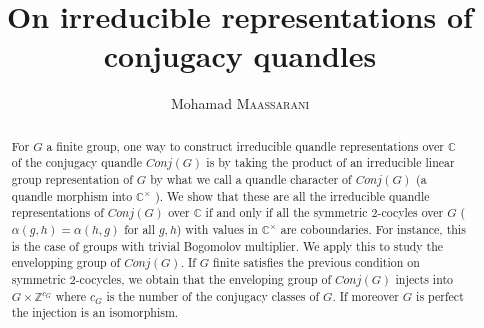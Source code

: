 \documentclass[12pt, reqno]{amsart}
\begin{document}
 
\title{On irreducible representations of conjugacy quandles}

 


 
\author{Mohamad \textsc{Maassarani} }
\maketitle
\begin{abstract}For $G$ a finite group, one way to construct irreducible quandle representations over $\mathbb{C}$ of the conjugacy quandle $Conj(G)$ is by taking the product of an irreducible linear group representation of $G$ by what we call a quandle character of $Conj(G)$ (a quandle morphism into $\mathbb{C}^\times$ ). We show that these are all the irreducible quandle representations of $Conj(G)$ over $\mathbb{C}$ if and only if all the symmetric $2$-cocyles over $G$  ($\alpha(g,h)=\alpha(h,g)$ for all $g,h$) with values in $\mathbb{C}^\times$ are coboundaries. For instance, this is the case of groups with trivial Bogomolov multiplier. We apply this to study the envelopping group of $Conj(G)$. If $G$ finite satisfies the previous condition on symmetric $2$-cocycles, we obtain that the enveloping group of $Conj(G)$ injects into $G\times \mathbb{Z}^{c_G}$ where $c_G$ is the number of the conjugacy classes of $G$. If moreover $G$ is perfect the injection is an isomorphism.
\end{abstract}
\end{document}
